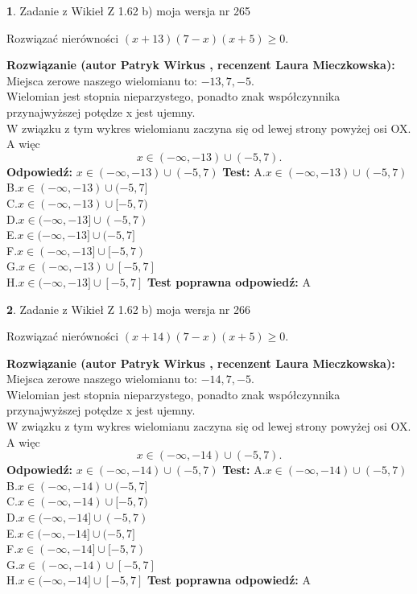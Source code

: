 \documentclass[12pt, a4paper]{article}
\theoremstyle{definition} %
\newtheorem{zad}{}
\newcommand{\zadStart}[1]{\begin{zad}#1\newline}
\newcommand{\zadStop}{\end{zad}}
\newcommand{\rozwStart}[2]{\noindent \textbf{Rozwiązanie (autor #1 , recenzent #2): }\newline}
\newcommand{\rozwStop}{\newline}
\newcommand{\odpStart}{\noindent \textbf{Odpowiedź:}\newline}
\newcommand{\odpStop}{\newline}
\newcommand{\testStart}{\noindent \textbf{Test:}\newline}
\newcommand{\testStop}{\newline}
\newcommand{\kluczStart}{\noindent \textbf{Test poprawna odpowiedź:}\newline}
\newcommand{\kluczStop}{\newline}
\begin{document}
\zadStart{Zadanie z Wikieł Z 1.62 b) moja wersja nr 265}

Rozwiązać nierówności $(x+13)(7-x)(x+5)\ge0$.
\zadStop
\rozwStart{Patryk Wirkus}{Laura Mieczkowska}
Miejsca zerowe naszego wielomianu to: $-13, 7, -5$.\\
Wielomian jest stopnia nieparzystego, ponadto znak współczynnika przy\linebreak najwyższej potędze x jest ujemny.\\ W związku z tym wykres wielomianu zaczyna się od lewej strony powyżej osi OX. A więc $$x \in (-\infty,-13) \cup (-5,7).$$
\rozwStop
\odpStart
$x \in (-\infty,-13) \cup (-5,7)$
\odpStop
\testStart
A.$x \in (-\infty,-13) \cup (-5,7)$\\
B.$x \in (-\infty,-13) \cup (-5,7]$\\
C.$x \in (-\infty,-13) \cup [-5,7)$\\
D.$x \in (-\infty,-13] \cup (-5,7)$\\
E.$x \in (-\infty,-13] \cup (-5,7]$\\
F.$x \in (-\infty,-13] \cup [-5,7)$\\
G.$x \in (-\infty,-13) \cup [-5,7]$\\
H.$x \in (-\infty,-13] \cup [-5,7]$
\testStop
\kluczStart
A
\kluczStop



\zadStart{Zadanie z Wikieł Z 1.62 b) moja wersja nr 266}

Rozwiązać nierówności $(x+14)(7-x)(x+5)\ge0$.
\zadStop
\rozwStart{Patryk Wirkus}{Laura Mieczkowska}
Miejsca zerowe naszego wielomianu to: $-14, 7, -5$.\\
Wielomian jest stopnia nieparzystego, ponadto znak współczynnika przy\linebreak najwyższej potędze x jest ujemny.\\ W związku z tym wykres wielomianu zaczyna się od lewej strony powyżej osi OX. A więc $$x \in (-\infty,-14) \cup (-5,7).$$
\rozwStop
\odpStart
$x \in (-\infty,-14) \cup (-5,7)$
\odpStop
\testStart
A.$x \in (-\infty,-14) \cup (-5,7)$\\
B.$x \in (-\infty,-14) \cup (-5,7]$\\
C.$x \in (-\infty,-14) \cup [-5,7)$\\
D.$x \in (-\infty,-14] \cup (-5,7)$\\
E.$x \in (-\infty,-14] \cup (-5,7]$\\
F.$x \in (-\infty,-14] \cup [-5,7)$\\
G.$x \in (-\infty,-14) \cup [-5,7]$\\
H.$x \in (-\infty,-14] \cup [-5,7]$
\testStop
\kluczStart
A
\kluczStop
\end{document}
